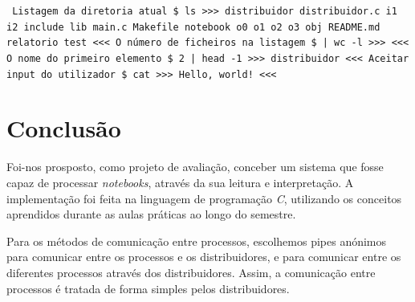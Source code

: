 \documentclass[12pt]{report}
\newcommand\tab[1][0.5cm]{\hspace*{#1}}
\begin{document}
\texttt{
\newline Listagem da diretoria atual
\newline \$ ls
\newline >>>
\newline distribuidor \newline distribuidor.c \newline i1 \newline i2
\newline include \newline lib \newline main.c \newline Makefile
\newline notebook \newline o0 \newline o1 \newline o2 \newline o3
\newline obj \newline README.md \newline relatorio \newline test
\newline <<<
\newline O número de ficheiros na listagem
\newline \$ | wc -l
\newline >>>
\newline <<<
\newline O nome do primeiro elemento
\newline \$ 2 | head -1
\newline >>>
\newline distribuidor
\newline <<<
\newline Aceitar input do utilizador
\newline \$ cat
\newline >>>
\newline Hello, world!
\newline <<<
\newline
}

\chapter{Conclusão}
\label{sec:conclusao}

\tab Foi-nos prosposto, como projeto de avaliação, conceber um sistema que fosse capaz de processar \textit{notebooks}, através da sua leitura e  interpretação. A implementação foi feita na linguagem de programação \textit{C}, utilizando os conceitos aprendidos durante as aulas práticas ao longo do semestre. 

Para os métodos de comunicação entre processos, escolhemos pipes anónimos para comunicar entre os processos e os distribuidores, e  para comunicar entre os diferentes processos através dos distribuidores. Assim, a comunicação entre processos é tratada de forma simples pelos distribuidores.
\end{document}
